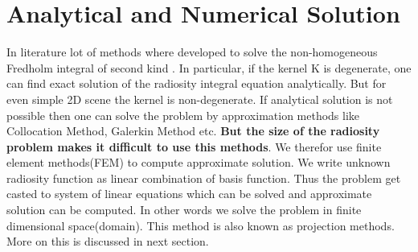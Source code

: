 \section{Analytical and Numerical Solution}
In literature lot of methods where developed to solve the non-homogeneous Fredholm integral of second kind \cite{iesurvey}\cite{ie}. In particular, if the kernel K is degenerate, one can find exact solution of the radiosity integral equation analytically\cite{ie}. But for even simple 2D scene the kernel is non-degenerate. If analytical solution is not possible then one can solve the problem by approximation methods like Collocation Method, Galerkin Method etc. {\bf But the size of the radiosity problem makes it difficult to use this methods}. We therefor use finite element methods(FEM) to compute approximate solution. We write unknown radiosity function as linear combination of basis function. Thus the problem get casted to system of linear equations which can be solved and approximate solution can be computed. In other words we solve the problem in finite dimensional space(domain). This method is also known as projection methods. More on this is discussed in next section.

